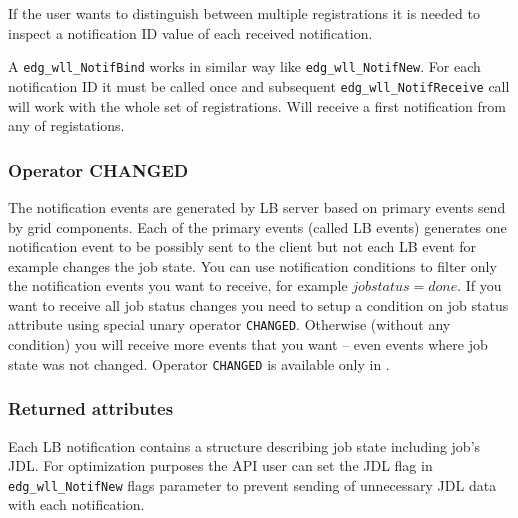 If the user wants to distinguish between multiple registrations it is
needed to inspect a notification ID value of each received notification.

A \verb'edg_wll_NotifBind' works in similar way like
\verb'edg_wll_NotifNew'. For each notification ID it must be called
once and subsequent \verb'edg_wll_NotifReceive' call will work with
the whole set of registrations. Will receive a first notification from
any of registations.

\subsubsection{Operator CHANGED}
%
The notification events are generated by LB server based on primary
events send by grid components. Each of the primary events (called LB
events) generates one notification event to be possibly sent to the
client but not each LB event for example changes the job state. You
can use notification conditions to filter only the notification
events you want to receive, for example $job status = done$. If you
want to receive all job status changes you need to setup a condition
on job status attribute using special unary operator
\verb'CHANGED'. Otherwise (without any condition) you will receive
more events that you want -- even events where job state was not
changed. Operator \verb'CHANGED' is available only in .

\subsubsection{Returned attributes}
%
Each LB notification contains a structure describing job state
including job's JDL. For optimization purposes the API user can set
the JDL flag in \verb'edg_wll_NotifNew' flags parameter to prevent
sending of unnecessary JDL data with each notification.

